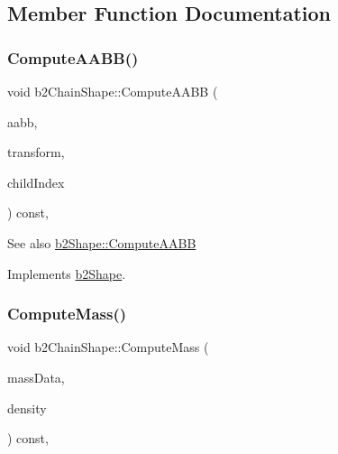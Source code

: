 \subsection{Member Function Documentation}
\mbox{\label{classb2ChainShape_ae1d7470ce8d32e92d27c149ab45f5468}} 
\subsubsection{\texorpdfstring{Compute\+A\+A\+B\+B()}{ComputeAABB()}}
{\footnotesize\ttfamily void b2\+Chain\+Shape\+::\+Compute\+A\+A\+BB (\begin{DoxyParamCaption}\item[{\mbox{\hyperlink{structb2AABB}{b2\+A\+A\+BB}} $\ast$}]{aabb,  }\item[{const \mbox{\hyperlink{structb2Transform}{b2\+Transform}} \&}]{transform,  }\item[{int32}]{child\+Index }\end{DoxyParamCaption}) const\hspace{0.3cm}{\ttfamily [override]}, {\ttfamily [virtual]}}

\begin{DoxySeeAlso}{See also}
\mbox{\hyperlink{classb2Shape_a88e9807fab0c8ca9a98d8926e50a1411}{b2\+Shape\+::\+Compute\+A\+A\+BB}} 
\end{DoxySeeAlso}


Implements \mbox{\hyperlink{classb2Shape_a88e9807fab0c8ca9a98d8926e50a1411}{b2\+Shape}}.

\mbox{\label{classb2ChainShape_aad3671d6eab61f6b26e2f1b6ac50bb98}} 
\subsubsection{\texorpdfstring{Compute\+Mass()}{ComputeMass()}}
{\footnotesize\ttfamily void b2\+Chain\+Shape\+::\+Compute\+Mass (\begin{DoxyParamCaption}\item[{\mbox{\hyperlink{structb2MassData}{b2\+Mass\+Data}} $\ast$}]{mass\+Data,  }\item[{float32}]{density }\end{DoxyParamCaption}) const\hspace{0.3cm}{\ttfamily [override]}, {\ttfamily [virtual]}}

